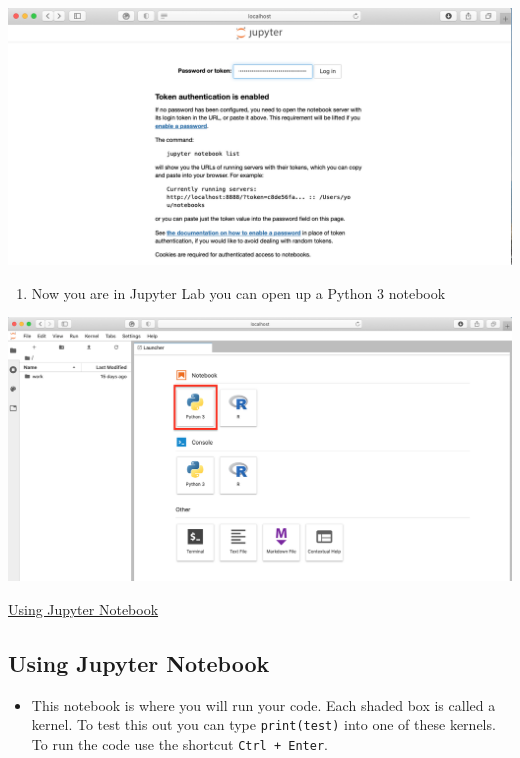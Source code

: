 \documentclass[
]{book}
\providecommand{\tightlist}{%
  \setlength{\itemsep}{0pt}\setlength{\parskip}{0pt}}
\begin{document}
\begin{center}\includegraphics[width=15.79in]{figs/chp1/Figure10} \end{center}

\begin{enumerate}
\def\labelenumi{\arabic{enumi}.}
\setcounter{enumi}{3}
\tightlist
\item
  Now you are in Jupyter Lab you can open up a Python 3 notebook
\end{enumerate}

\begin{center}\includegraphics[width=19.21in]{figs/chp1/Figure11} \end{center}

\protect\hyperlink{using-jupyter-notebook}{Using Jupyter Notebook}

\hypertarget{using-jupyter-notebook}{%
\subsection*{Using Jupyter Notebook}\label{using-jupyter-notebook}}

\begin{itemize}
\tightlist
\item
  This notebook is where you will run your code. Each shaded box is called a kernel. To test this out you can type \texttt{print(\textquotesingle{}test\textquotesingle{})} into one of these kernels. To run the code use the shortcut \texttt{Ctrl\ +\ Enter}.
\end{itemize}
\end{document}
